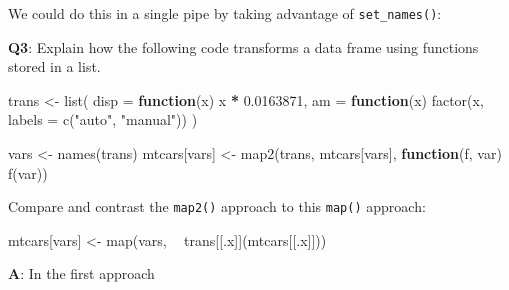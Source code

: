 \documentclass[
]{krantz}
\makeatletter
\newenvironment{Shaded}{\begin{snugshade}}{\end{snugshade}}
\newcommand{\ControlFlowTok}[1]{\textcolor[rgb]{0.13,0.29,0.53}{\textbf{#1}}}
\newcommand{\DataTypeTok}[1]{\textcolor[rgb]{0.13,0.29,0.53}{#1}}
\newcommand{\FloatTok}[1]{\textcolor[rgb]{0.00,0.00,0.81}{#1}}
\newcommand{\KeywordTok}[1]{\textcolor[rgb]{0.13,0.29,0.53}{\textbf{#1}}}
\newcommand{\NormalTok}[1]{#1}
\newcommand{\OperatorTok}[1]{\textcolor[rgb]{0.81,0.36,0.00}{\textbf{#1}}}
\newcommand{\StringTok}[1]{\textcolor[rgb]{0.31,0.60,0.02}{#1}}
\newenvironment{kframe}{%
\medskip{}
\setlength{\fboxsep}{.8em}
 \def\at@end@of@kframe{}%
 \ifinner\ifhmode%
  \def\at@end@of@kframe{\end{minipage}}%
  \begin{minipage}{\columnwidth}%
 \fi\fi%
 \def\FrameCommand##1{\hskip\@totalleftmargin \hskip-\fboxsep
 \colorbox{shadecolor}{##1}\hskip-\fboxsep
     \hskip-\linewidth \hskip-\@totalleftmargin \hskip\columnwidth}%
 \MakeFramed {\advance\hsize-\width
   \@totalleftmargin\z@ \linewidth\hsize
   \@setminipage}}%
 {\par\unskip\endMakeFramed%
 \at@end@of@kframe}
\renewenvironment{Shaded}{\begin{kframe}}{\end{kframe}}
\renewcommand{\KeywordTok} [1]{\textcolor[rgb]{0.00,0.44,0.13}{{#1}}}
\renewcommand{\DataTypeTok}[1]{\textcolor[rgb]{0.56,0.13,0.00}{{#1}}}
\renewcommand{\FloatTok}   [1]{\textcolor[rgb]{0.25,0.63,0.44}{{#1}}}
\renewcommand{\StringTok}  [1]{\textcolor[rgb]{0.25,0.44,0.63}{{#1}}}
\renewcommand{\NormalTok}  [1]{{#1}}
\makeatother
\begin{document}
We could do this in a single pipe by taking advantage of \texttt{set\_names()}:

\begin{Shaded}
\end{Shaded}

\textbf{{Q3}}: Explain how the following code transforms a data frame using functions stored in a list.

\begin{Shaded}
\begin{Highlighting}[]
\NormalTok{trans <-}\StringTok{ }\KeywordTok{list}\NormalTok{(}
  \DataTypeTok{disp =} \ControlFlowTok{function}\NormalTok{(x) x }\OperatorTok{*}\StringTok{ }\FloatTok{0.0163871}\NormalTok{,}
  \DataTypeTok{am =} \ControlFlowTok{function}\NormalTok{(x) }\KeywordTok{factor}\NormalTok{(x, }\DataTypeTok{labels =} \KeywordTok{c}\NormalTok{(}\StringTok{"auto"}\NormalTok{, }\StringTok{"manual"}\NormalTok{))}
\NormalTok{)}

\NormalTok{vars <-}\StringTok{ }\KeywordTok{names}\NormalTok{(trans)}
\NormalTok{mtcars[vars] <-}\StringTok{ }\KeywordTok{map2}\NormalTok{(trans, mtcars[vars], }\ControlFlowTok{function}\NormalTok{(f, var) }\KeywordTok{f}\NormalTok{(var))}
\end{Highlighting}
\end{Shaded}

Compare and contrast the \texttt{map2()} approach to this \texttt{map()} approach:

\begin{Shaded}
\begin{Highlighting}[]
\NormalTok{mtcars[vars] <-}\StringTok{ }\KeywordTok{map}\NormalTok{(vars, }\OperatorTok{~}\StringTok{ }\NormalTok{trans[[.x]](mtcars[[.x]]))}
\end{Highlighting}
\end{Shaded}

\textbf{{A}}: In the first approach
\end{document}
